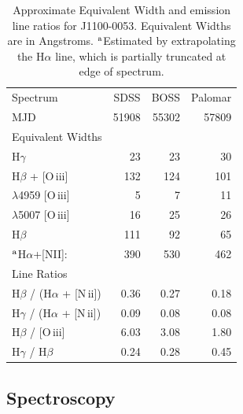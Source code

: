 \documentclass[a4paper,fleqn,usenatbib]{mnras}
\begin{document}
{\bf 
  \begin{table}
    \centering
    \begin{tabular}{l r r r}
      \hline \hline 
       Spectrum                                                        &	SDSS  &	BOSS    &	Palomar\\
      MJD                                                                  &    51908 &  55302  &    57809          \\              
      \hline   
       Equivalent Widths & & & \\   
     H$\gamma$                                                       &    23       &   23    &    30 \\
      H$\beta$ +  [O\,{\sc iii}]                                   &  132       & 124    &  101 \\
        $\lambda$4959 [O\,{\sc iii}]                           &      5       &     7    &   11 \\
         $\lambda$5007 [O\,{\sc iii}]                          &    16      &  25 &     26\\
      H$\beta$                                                           &  111     &   92   &    65\\
     $^{{\rm a}}$H$\alpha$+[NII]:                                 &  390     &  530    &   462\\
      \hline   
      Line Ratios  & & & \\
      H$\beta$      / (H$\alpha$ + [N\,{\sc ii}])   &  0.36    &  0.27   &  0.18 \\
      H$\gamma$ / (H$\alpha$ + [N\,{\sc ii}])   &  0.09    &  0.08   &  0.08 \\
      H$\beta$      / [O\,{\sc iii}]   	                  &  6.03    &  3.08   &  1.80  \\ 
      H$\gamma$ / H$\beta$      	                  &  0.24    &  0.28   &  0.45 \\
      \hline \hline 
  \end{tabular}
      \caption{Approximate Equivalent Width and emission line ratios for J1100-0053.
        Equivalent Widths are in Angstroms. 
        $^{{\rm a}}$Estimated by extrapolating the H$\alpha$ line, which is partially truncated at edge of spectrum.} 
      \label{tab:line_ratios}
\end{table}
}

\subsection{Spectroscopy}
\end{document}
